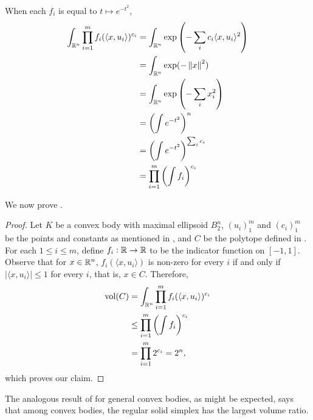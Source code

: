 When each $f_i$ is equal to $t\mapsto e^{-t^2}$,
\begin{align*}
    \int_{\mathbb{R}^n} \prod_{i=1}^m f_i(\langle x,u_i\rangle)^{c_i} &= \int_{\mathbb{R}^n} \exp\left(-\sum_i c_i \langle x,u_i\rangle^2\right) \\
    &= \int_{\mathbb{R}^n} \exp(-\left\lVert x\right\rVert^2) \\
    &= \int_{\mathbb{R}^n} \exp\left(-\sum_i x_i^2\right) \\
    &= \left(\int e^{-t^2}\right)^n \\
    &= \left(\int e^{-t^2}\right)^{\sum_i c_i} \\
    &= \prod_{i=1}^m \left(\int f_i\right)^{c_i}
\end{align*}

We now prove .

\begin{proof}
Let $K$ be a convex body with maximal ellipsoid $B_2^n$, $(u_i)_1^m$ and $(c_i)_1^m$ be the points and constants as mentioned in , and $C$ be the polytope defined in . For each $1\leq i\leq m$, define $f_i:\mathbb{R}\to\mathbb{R}$ to be the indicator function on $[-1,1]$. Observe that for $x\in\mathbb{R}^n$, $f_i(\langle x,u_i\rangle)$ is non-zero for every $i$ if and only if $|\langle x,u_i\rangle|\leq 1$ for every $i$, that is, $x\in C$. Therefore,
\begin{align*}
    \operatorname{vol}(C) &= \int_{\mathbb{R}^n} \prod_{i=1}^m f_i(\langle x,u_i\rangle)^{c_i} \\
    &\leq \prod_{i=1}^m \left(\int f_i\right)^{c_i} \\
    &= \prod_{i=1}^m 2^{c_i} = 2^n,
\end{align*}
which proves our claim.
\end{proof}

The analogous result of  for general convex bodies, as might be expected, says that among convex bodies, the regular solid simplex has the largest volume ratio.